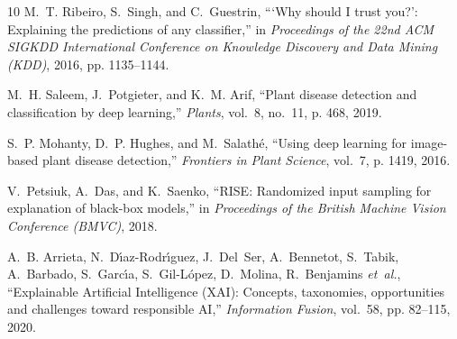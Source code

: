 \documentclass[journal,10pt,twocolumn]{article}
\begin{document}
\begin{thebibliography}{10}
M.~T. Ribeiro, S.~Singh, and C.~Guestrin, ```Why should {I} trust you?': Explaining the predictions of any classifier,'' in \emph{Proceedings of the 22nd ACM SIGKDD International Conference on Knowledge Discovery and Data Mining (KDD)}, 2016, pp. 1135--1144.

M.~H. Saleem, J.~Potgieter, and K.~M. Arif, ``Plant disease detection and classification by deep learning,'' \emph{Plants}, vol.~8, no.~11, p. 468, 2019.

S.~P. Mohanty, D.~P. Hughes, and M.~Salath{\'e}, ``Using deep learning for image-based plant disease detection,'' \emph{Frontiers in Plant Science}, vol.~7, p. 1419, 2016.

V.~Petsiuk, A.~Das, and K.~Saenko, ``{RISE}: Randomized input sampling for explanation of black-box models,'' in \emph{Proceedings of the British Machine Vision Conference (BMVC)}, 2018.

A.~B. Arrieta, N.~D{\'\i}az-Rodr{\'\i}guez, J.~Del~Ser, A.~Bennetot, S.~Tabik, A.~Barbado, S.~Garc{\'\i}a, S.~Gil-L{\'o}pez, D.~Molina, R.~Benjamins \emph{et~al.}, ``Explainable {Artificial Intelligence} ({XAI}): Concepts, taxonomies, opportunities and challenges toward responsible {AI},'' \emph{Information Fusion}, vol.~58, pp. 82--115, 2020.

\end{thebibliography}
\end{document}
